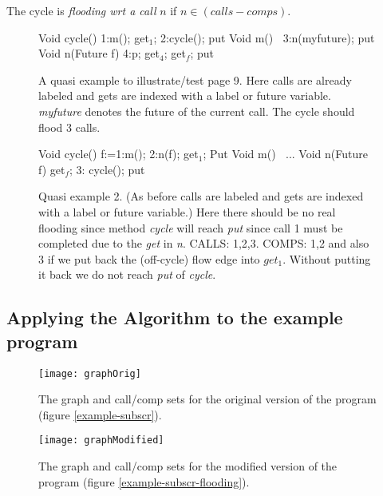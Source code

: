 \documentclass[12pt]{article}%
\begin{document}
\begin{theorem}
The cycle is \emph{flooding wrt a call} $n$ if 
$n\in (calls -comps)$.
\end{theorem}


\begin{figure}
\begin{abs}
Void cycle()      {1:m(); get$_1$; 2:cycle(); put}
Void m()$\ \ \ \ ${3:n(myfuture); put}
Void n(Future f)  {4:p; get$_4$; get$_f$; put}
\end{abs}
\caption{\label{example-quasi}
A  quasi example to illustrate/test page 9.
Here calls are already labeled and gets are indexed with
a label or future variable. \emph{myfuture} denotes the
future of the current call. The cycle should flood 3 calls.}
\end{figure}



\begin{figure}
\begin{abs}
Void cycle()      {f:=1:m(); 2:n(f); get$_1$; Put}
Void m()$\ \ \ \ ${...}
Void n(Future f)  {get$_f$; 3: cycle(); put}
\end{abs}
\caption{\label{example-quasi2}
  Quasi example 2.
(As before calls are  labeled and gets are indexed with
a label or future variable.) 
%
Here there should be no real flooding since method
 \emph{cycle} will reach  \emph{put} since call 1 must be completed
due to the   \emph{get} in  \emph{n}.
CALLS: 1,2,3.  
COMPS: 1,2 and also 3 if we put back the (off-cycle)  flow edge into 
 $get_1$.
Without putting it back we do not reach \emph{put} of \emph{cycle}.
}
\end{figure}

\subsection{Applying the Algorithm to the example program}


\begin{figure}[t]
\texttt{[image: graphOrig]}
\caption{\label{graph-orig}
The graph and call/comp sets for the original version of the program (figure \ref{example-subscr}).
}
\end{figure}

\begin{figure}[t]
\texttt{[image: graphModified]}
\caption{\label{graph-modified}
The graph and call/comp sets for the modified version of the program (figure \ref{example-subscr-flooding}).
}
\end{figure}
\end{document}
